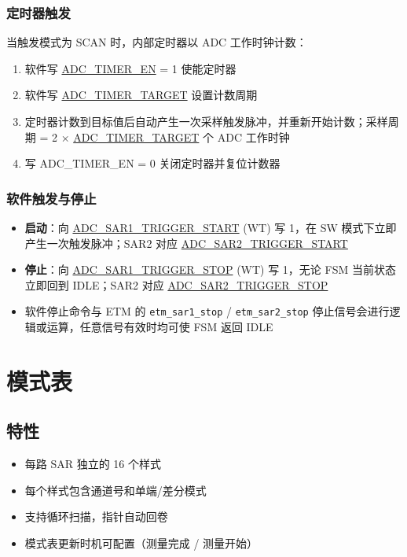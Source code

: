 \documentclass[main\_\_CN.tex]{subfiles}
\begin{document}
\subsubsection{定时器触发}
当触发模式为 SCAN 时，内部定时器以 ADC 工作时钟计数：
\begin{enumerate}
    \item 软件写 \hyperref[fielddesc:ADCTIMEREN]{ADC\_TIMER\_EN} = 1 使能定时器
    \item 软件写 \hyperref[fielddesc:ADCTIMERTARGET]{ADC\_TIMER\_TARGET} 设置计数周期
    \item 定时器计数到目标值后自动产生一次采样触发脉冲，并重新开始计数；采样周期 = 2 × \hyperref[fielddesc:ADCTIMERTARGET]{ADC\_TIMER\_TARGET} 个 ADC 工作时钟 
    \item 写 ADC\_TIMER\_EN = 0 关闭定时器并复位计数器
\end{enumerate}

\subsubsection{软件触发与停止}
\begin{itemize}
    \item \textbf{启动}：向 \hyperref[fielddesc:ADCSAR1TRIGGERSTART]{ADC\_SAR1\_TRIGGER\_START} (WT) 写 1，在 SW 模式下立即产生一次触发脉冲；SAR2 对应 \hyperref[fielddesc:ADCSAR2TRIGGERSTART]{ADC\_SAR2\_TRIGGER\_START}
    \item \textbf{停止}：向 \hyperref[fielddesc:ADCSAR1TRIGGERSTOP]{ADC\_SAR1\_TRIGGER\_STOP} (WT) 写 1，无论 FSM 当前状态立即回到 IDLE；SAR2 对应 \hyperref[fielddesc:ADCSAR2TRIGGERSTOP]{ADC\_SAR2\_TRIGGER\_STOP}
    \item 软件停止命令与 ETM 的 \verb+etm_sar1_stop+ / \verb+etm_sar2_stop+ 停止信号会进行逻辑或运算，任意信号有效时均可使 FSM 返回 IDLE
\end{itemize}


\section{模式表}
\label{sec:adc-pattern}

\subsection{特性}

\begin{itemize}
    \item 每路 SAR 独立的 16 个样式
    \item 每个样式包含通道号和单端/差分模式
    \item 支持循环扫描，指针自动回卷
    \item 模式表更新时机可配置（测量完成 / 测量开始）
\end{itemize}
\end{document}
